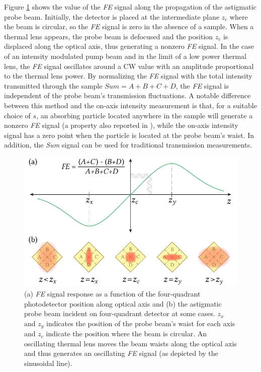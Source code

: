 \documentclass[9pt,twocolumn,twoside]{osajnl}
\newcommand{\FE}{\textit{FE}}
\newcommand{\Sum}{\textit{Sum}}
\begin{document}
Figure \ref{fig:FESignal} shows the value of the \FE{} signal along the propagation of the astigmatic probe beam. Initially, the detector is placed at the intermediate plane $z_c$ where the beam is circular, so the \FE{} signal is zero in the absence of a sample. When a thermal lens appears, the probe beam is defocused and the position $z_c$ is displaced along the optical axis, thus generating a nonzero \FE{} signal. In the case of an intensity modulated pump beam and in the limit of a low power thermal lens, the \FE{} signal oscillates around a CW value with an amplitude proportional to the thermal lens power. By normalizing the \FE{} signal with the total intensity transmitted through the sample $\Sum{} = A+B+C+D$, the \FE{} signal is independent of the probe beam's transmission fluctuations. A notable difference between this method and the on-axis intensity measurement is that, for a suitable choice of $s$, an absorbing particle located anywhere in the sample will generate a nonzero \FE{} signal (a property also reported in \cite{Moreau2004}), while the on-axis intensity signal has a zero point when the particle is located at the probe beam's waist. In addition, the \Sum{} signal can be used for traditional transmission measurements.

\begin{figure}[ht]
	\centering \includegraphics[width=.46\textwidth]{figures/FESignal.pdf}
	\caption{(a) \FE{} signal response as a function of the four-quadrant photodetector position along optical axis and (b) the astigmatic probe beam incident on four-quadrant detector at some cases. $z_x$ and $z_y$ indicates the position of the probe beam's waist for each axis and $z_c$ indicate the position where the beam is circular. An oscillating thermal lens moves the beam waists along the optical axis and thus generates an oscillating \FE{} signal (as depicted by the sinusoidal line).}
	\label{fig:FESignal}
\end{figure}
\end{document}
